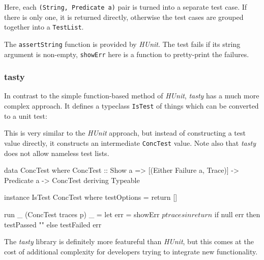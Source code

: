 Here, each \verb|(String, Predicate a)| pair is turned into a separate
test case. If there is only one, it is returned directly, otherwise
the test cases are grouped together into a \verb|TestList|.

The \verb|assertString| function is provided by \emph{HUnit}. The test
fails if its string argument is non-empty, \verb|showErr| here is a
function to pretty-print the failures.

\subsubsection{tasty}
\label{sec:practice-integration-tasty}

In contrast to the simple function-based method of \emph{HUnit},
\emph{tasty} has a much more complex approach. It defines a typeclass
\verb|IsTest| of things which can be converted to a unit test:


This is very similar to the \emph{HUnit} approach, but instead of
constructing a test value directly, it constructs an intermediate
\verb|ConcTest| value. Note also that \emph{tasty} does not allow
nameless test lists.

\begin{haskellcode}
data ConcTest where
  ConcTest :: Show a => [(Either Failure a, Trace)] -> Predicate a -> ConcTest
  deriving Typeable

instance IsTest ConcTest where
  testOptions = return []

  run _ (ConcTest traces p) _ =
    let err = showErr $ p traces
     in return $ if null err then testPassed "" else testFailed err
\end{haskellcode}

The \emph{tasty} library is definitely more featureful than
\emph{HUnit}, but this comes at the cost of additional complexity for
developers trying to integrate new functionality.
